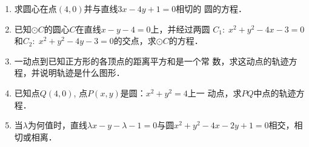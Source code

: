 \begin{enumerate}
\item 求圆心在点$(4,0)$并与直线$3x-4y+1=0$相切的
圆的方程．
\item 已知$\odot C$的圆心$C$在直线$x-y-4=0$上，并经过两圆
$C_1:\; x^2+y^2-4x-3=0$和$C_2:\; x^2+y^2-4y-3
=0$的交点，求$\odot C$的方程．
\item 一动点到已知正方形的各顶点的距离平方和是一个常
数，求这动点的轨迹方程，并说明轨迹是什么图形．
\item 已知点$Q(4,0)$, 点$P(x,y)$是圆：$x^2+y^2=4$上一
动点，求$PQ$中点的轨迹方程．
\item 当$\lambda$为何值时，直线$\lambda x-y-\lambda-1=0$与圆$x^2+y^2-
4x-2y+1=0$相交，相切或相离．
\end{enumerate}